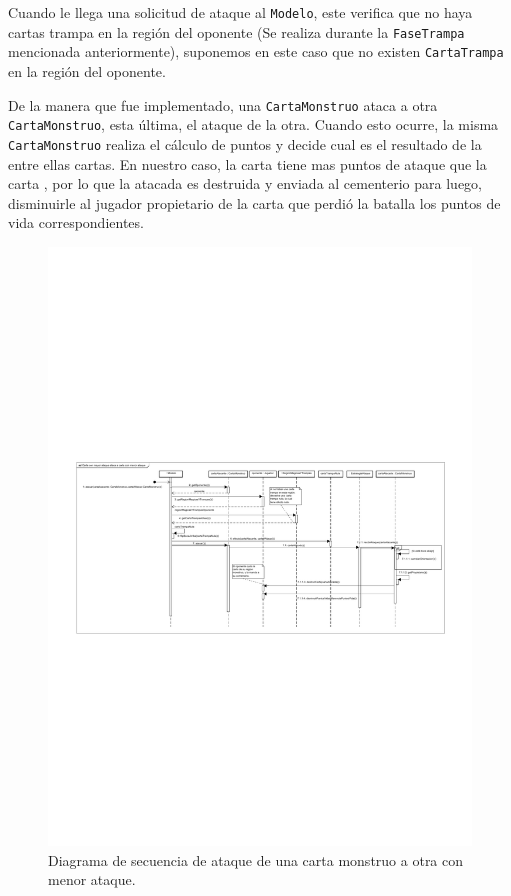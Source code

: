 	Cuando le llega una solicitud de ataque al \texttt{Modelo}, este verifica que no haya cartas trampa en la región del oponente (Se realiza durante la \texttt{FaseTrampa} mencionada anteriormente), suponemos en este caso que no existen \texttt{CartaTrampa} en la región del oponente.
	
	De la manera que fue implementado, una \texttt{CartaMonstruo} ataca a otra \texttt{CartaMonstruo}, esta última,  el ataque de la otra. Cuando esto ocurre, la misma \texttt{CartaMonstruo} realiza el cálculo de puntos y decide cual es el resultado de la  entre ellas cartas. En nuestro caso, la carta  tiene mas puntos de ataque que la carta , por lo que la atacada es destruida y enviada al cementerio para luego, disminuirle al jugador propietario de la carta que perdió la batalla los puntos de vida correspondientes.
	
	\begin{figure}[H]
		\centering
		\includegraphics[scale=0.9]{includes/seq_Carta_con_mayor_ataque_ataca_a_carta_con_menor_ataque}
		\caption{Diagrama de secuencia de ataque de una carta monstruo a otra con menor ataque.}
		\label{seq_Carta_con_mayor_ataque_ataca_a_carta_con_menor_ataque}
	\end{figure}
	
